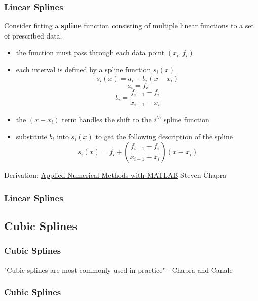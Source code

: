 \documentclass[fleqn]{beamer} %
\newcommand{\sectionIIIsubsectionIIItitle}{Linear Splines}
\newcommand{\sectionIIIsubsectionIVtitle}{Cubic Splines}
\begin{document}
			\begin{frame}
				\frametitle{\sectionIIIsubsectionIIItitle}
				\bigskip
        
        Consider fitting a {\bf spline} function consisting of multiple linear functions to a set of prescribed data. \\
        
        \begin{itemize}
          \item the function must pass through each data point $\left(x_i,f_i\right)$
          \item each interval is defined by a spline function $s_i(x)$
          \[s_i\left(x\right)=a_i+b_i(x-x_i) \]
          \[a_i=f_i\] \[b_i=\frac{f_{i+1}-f_i}{x_{i+1}-x_i}\]
          \item the $(x-x_i)$ term handles the shift to the $i^{th}$ spline function
          \item substitute $b_i$ into $s_i(x)$ to get the following description of the spline
          \[s_i\left(x\right)=f_i+\left(\frac{f_{i+1}-f_i}{x_{i+1}-x_i}\right)\left(x-x_i\right) \]
        \end{itemize}

				\btVFill
        \tiny{Derivation: \underline{Applied Numerical Methods with MATLAB} Steven Chapra}
			
    \end{frame}

		\begin{frame}
				\frametitle{\sectionIIIsubsectionIIItitle}
				\bigskip
        
			
    \end{frame}
		\subsection{\sectionIIIsubsectionIVtitle}\label{sectionIIIsubsectionIV}

			\begin{frame}
				\frametitle{\sectionIIIsubsectionIVtitle}
				\bigskip
        
        "Cubic splines are most commonly used in practice" - Chapra and Canale

				\btVFill
			\end{frame}	

			\begin{frame}
				\frametitle{\sectionIIIsubsectionIVtitle} \small
				\bigskip
        
				\btVFill
			\end{frame}	
\end{document}

